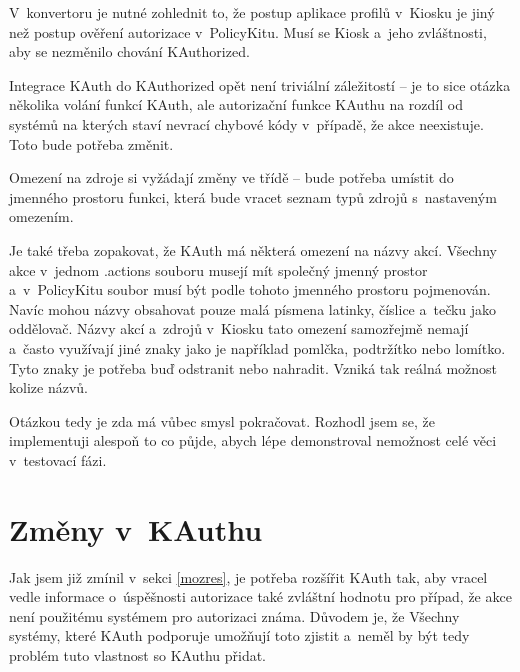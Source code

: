 V~konvertoru je nutné zohlednit to, že postup aplikace profilů v~Kiosku je jiný než postup ověření autorizace v~PolicyKitu. Musí se  Kiosk a~jeho zvláštnosti, aby se nezměnilo chování KAuthorized.

Integrace KAuth do KAuthorized opět není triviální záležitostí -- je to sice otázka několika volání funkcí KAuth, ale autorizační funkce KAuthu na rozdíl od systémů na kterých staví nevrací chybové kódy v~případě, že akce neexistuje. Toto bude potřeba změnit.

Omezení na zdroje  si vyžádají změny ve třídě  -- bude potřeba umístit do jmenného prostoru  funkci, která bude vracet seznam typů zdrojů s~nastaveným omezením.

Je také třeba zopakovat, že KAuth má některá omezení na názvy akcí. Všechny akce v~jednom .actions souboru musejí mít společný jmenný prostor a~v~PolicyKitu soubor musí být podle tohoto jmenného prostoru pojmenován. Navíc mohou názvy obsahovat pouze malá písmena latinky, číslice a~tečku jako oddělovač. Názvy akcí a~zdrojů v~Kiosku tato omezení samozřejmě nemají a~často využívají jiné znaky jako je například pomlčka, podtržítko nebo lomítko. Tyto znaky je potřeba buď odstranit nebo nahradit. Vzniká tak reálná možnost kolize názvů.

Otázkou tedy je zda má vůbec smysl pokračovat. Rozhodl jsem se, že implementuji alespoň to co půjde, abych lépe demonstroval nemožnost celé věci v~testovací fázi.
\section{Změny v~KAuthu}
Jak jsem již zmínil v~sekci \ref{mozres}, je potřeba rozšířit KAuth tak, aby vracel vedle informace o~úspěšnosti autorizace také zvláštní hodnotu pro případ, že akce není použitému systémem pro autorizaci známa. Důvodem je, že  Všechny systémy, které KAuth podporuje umožňují toto zjistit a~neměl by být tedy problém tuto vlastnost so KAuthu přidat.
